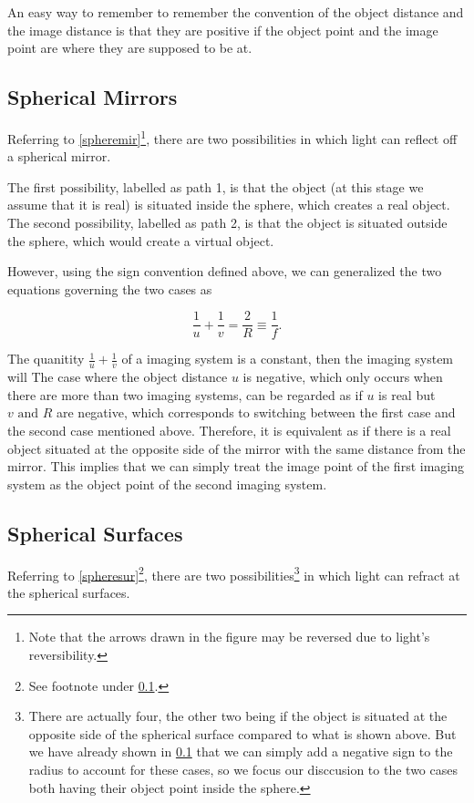 \documentclass[english,a4paper,12pt]{report}
\begin{document}
An easy way to remember to remember the convention of the object distance and the image distance is that they are positive if the object point and the image point are where they are supposed to be at.

\subsection{Spherical Mirrors} \label{spheremirsec} 

Referring to \cref{spheremir}\footnote{Note that the arrows drawn in the figure may be reversed due to light's reversibility.}, there are two possibilities in which light can reflect off a spherical mirror.


The first possibility, labelled as path 1, is that the object (at this stage we assume that it is real) is situated inside the sphere, which creates a real object. The second possibility, labelled as path 2, is that the object is situated outside the sphere, which would create a virtual object.

However, using the sign convention defined above, we can generalized the two equations governing the two cases as 

\begin{equation}
    \frac{1}{u} + \frac{1}{v} = \frac{2}{R} \equiv \frac{1}{f}.
\end{equation}

The quanitity \(\frac{1}{u} + \frac{1}{v}\) of a imaging system is a constant, then the imaging system will  
The case where the object distance \(u\) is negative, which only occurs when there are more than two imaging systems, can be regarded as if \(u\) is real but \(v \text { and } R\) are negative, which corresponds to switching between the first case and the second case mentioned above. Therefore, it is equivalent as if there is a real object situated at the opposite side of the mirror with the same distance from the mirror. This implies that we can simply treat the image point of the first imaging system as the object point of the second imaging system.

\subsection{Spherical Surfaces}

Referring to \cref{spheresur}\footnote{See footnote under \cref{spheremirsec}.}, there are two possibilities\footnote{There are actually four, the other two being if the object is situated at the opposite side of the spherical surface compared to what is shown above. But we have already shown in \cref{spheremirsec} that we can simply add a negative sign to the radius to account for these cases, so we focus our disccusion to the two cases both having their object point inside the sphere.}  in which light can refract at the spherical surfaces.
\end{document}
